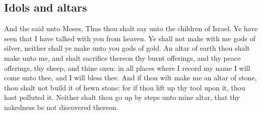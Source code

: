 \begin{biblechapter}
\section*{Idols and altars}
\verse And the \LORD said unto Moses, Thus thou shalt say unto the children of Israel, Ye have seen that I have talked with you from heaven.
\verse Ye shall not make with me gods of silver, neither shall ye make unto you gods of gold.
\verse An altar of earth thou shalt make unto me, and shalt sacrifice thereon thy burnt offerings, and thy peace offerings, thy sheep, and thine oxen: in all places where I record my name I will come unto thee, and I will bless thee.
\verse And if thou wilt make me an altar of stone, thou shalt not build it of hewn stone: for if thou lift up thy tool upon it, thou hast polluted it.
\verse Neither shalt thou go up by steps unto mine altar, that thy nakedness be not discovered thereon.
\end{biblechapter}

